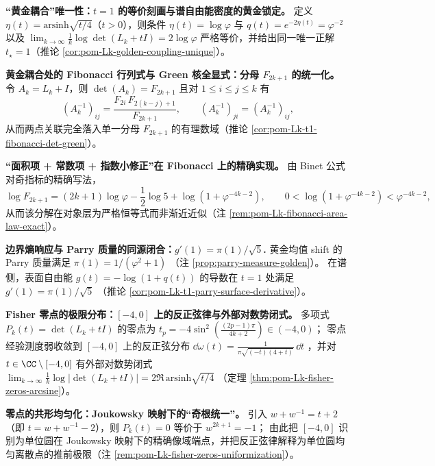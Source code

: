     \item \textbf{“黄金耦合”唯一性：\texorpdfstring{\(t=1\)}{t=1} 的等价刻画与谱自由能密度的黄金锁定。}
    定义 \(\eta(t)=\mathrm{arsinh}\sqrt{t/4}\)（\(t>0\)），则条件
    \(
    \eta(t)=\log\varphi
    \)
    与
    \(
    q(t)=e^{-2\eta(t)}=\varphi^{-2}
    \)
    以及
    \(
    \lim_{k\to\infty}\frac1k\log\det(L_k+tI)=2\log\varphi
    \)
    严格等价，并给出同一唯一正解 \(t_\star=1\)（推论 \ref{cor:pom-Lk-golden-coupling-unique}）。

    \item \textbf{黄金耦合处的 Fibonacci 行列式与 Green 核全显式：分母 \texorpdfstring{\(F_{2k+1}\)}{F_{2k+1}} 的统一化。}
    令 \(A_k=L_k+I\)，则
    \(
    \det(A_k)=F_{2k+1}
    \)
    且对 \(1\le i\le j\le k\) 有
    \[
    (A_k^{-1})_{ij}=\frac{F_{2i}\,F_{2(k-j)+1}}{F_{2k+1}},
    \qquad (A_k^{-1})_{ji}=(A_k^{-1})_{ij},
    \]
    从而两点关联完全落入单一分母 \(F_{2k+1}\) 的有理数域（推论 \ref{cor:pom-Lk-t1-fibonacci-det-green}）。

    \item \textbf{“面积项 + 常数项 + 指数小修正”在 Fibonacci 上的精确实现。}
    由 Binet 公式对奇指标的精确写法，
    \[
    \log F_{2k+1}=(2k+1)\log\varphi-\frac12\log 5+\log(1+\varphi^{-4k-2}),
    \qquad 0<\log(1+\varphi^{-4k-2})<\varphi^{-4k-2},
    \]
    从而该分解在对象层为严格恒等式而非渐近近似（注 \ref{rem:pom-Lk-fibonacci-area-law-exact}）。

    \item \textbf{边界熵响应与 Parry 质量的同源闭合：\texorpdfstring{\(g'(1)=\pi(1)/\sqrt5\)}{g'(1)=pi(1)/sqrt5}.}
    黄金均值 shift 的 Parry 质量满足
    \(
    \pi(1)=1/(\varphi^2+1)
    \)
    （注 \ref{prop:parry-measure-golden}）。
    在谱侧，表面自由能 \(g(t)=-\log(1+q(t))\) 的导数在 \(t=1\) 处满足
    \(
    g'(1)=\pi(1)/\sqrt5
    \)
    （推论 \ref{cor:pom-Lk-t1-parry-surface-derivative}）。

    \item \textbf{Fisher 零点的极限分布：\texorpdfstring{\([-4,0]\)}{[-4,0]} 上的反正弦律与外部对数势闭式。}
    多项式 \(P_k(t)=\det(L_k+tI)\) 的零点为
    \(
    t_p=-4\sin^2(\frac{(2p-1)\pi}{4k+2})\in(-4,0)
    \)；
    零点经验测度弱收敛到 \([-4,0]\) 上的反正弦分布
    \(
    \dd\omega(t)=\frac{1}{\pi\sqrt{(-t)(4+t)}}\,\dd t
    \)
    ，并对 \(t\in\CC\setminus[-4,0]\) 有外部对数势闭式
    \(
    \lim_{k\to\infty}\frac1k\log|\det(L_k+tI)|=2\Re\,\mathrm{arsinh}\sqrt{t/4}
    \)
    （定理 \ref{thm:pom-Lk-fisher-zeros-arcsine}）。

    \item \textbf{零点的共形均匀化：Joukowsky 映射下的“奇根统一”。}
    引入 \(w+w^{-1}=t+2\)（即 \(t=w+w^{-1}-2\)），则 \(P_k(t)=0\) 等价于 \(w^{2k+1}=-1\)；
    由此把 \([-4,0]\) 识别为单位圆在 Joukowsky 映射下的精确像域端点，并把反正弦律解释为单位圆均匀离散点的推前极限（注 \ref{rem:pom-Lk-fisher-zeros-uniformization}）。

